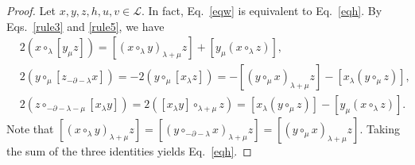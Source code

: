 \documentclass[10pt,a4paper]{amsart}
\begin{document}
\begin{proof}
Let $x,y,z,h,u,v \in \mathcal{L}$. In fact, Eq.~\eqref{eqw} is equivalent to Eq.~\eqref{eqh}. By Eqs.~\eqref{rule3} and \eqref{rule5}, we have
   \begin{align*}
      &{2} (x\circ_{\lambda}[y_{\mu}z])=[(x\circ_{\lambda}y)_{\lambda+\mu}z]+[y_{\mu}(x\circ_{\lambda}z)],	\\
      &{2} (y\circ_{\mu}[z_{-\partial-\lambda}x])=-{2} (y\circ_{\mu}[x_{\lambda}z])=-[(y\circ_{\mu}x)_{\lambda+\mu}z]-[x_{\lambda}(y\circ_{\mu}z)],\\
      &{2} (z\circ_{-\partial-\lambda-\mu}[x_{\lambda}y])={2} ([x_{\lambda}y]\circ_{\lambda+\mu}z)=[x_{{\lambda}}(y\circ_{\mu}z)]-[y_{\mu}(x\circ_{\lambda}z)].
   \end{align*}
Note that $[(x\circ_{\lambda}y)_{\lambda+\mu}z]=[(y\circ_{-\partial-\lambda}x)_{\lambda+\mu}z]=[(y\circ_{\mu}x)_{\lambda+\mu}z]$. Taking the sum of the three identities yields Eq.~\eqref{eqh}.


\end{proof}
\end{document}
